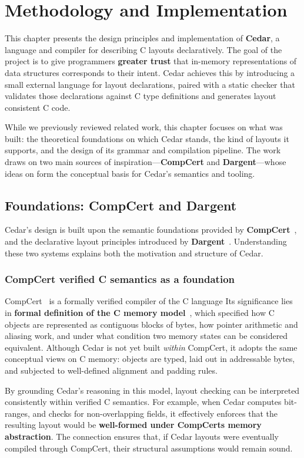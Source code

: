\section{Methodology and Implementation}
This chapter presents the design principles and implementation of
\textbf{Cedar}, a language and compiler for describing
C layouts declaratively.
The goal of the project is to give programmers
\textbf{greater trust} that in-memory representations of data structures
corresponds to their intent.
Cedar achieves this by introducing a small external language
for layout declarations, paired with a static checker that validates 
those declarations against C type definitions and generates
layout consistent C code.

While we previously reviewed related work, this chapter focuses on what
was built: the theoretical foundations on which Cedar stands, the kind
of layouts it supports, and the design of its grammar and compilation
pipeline.
The work draws on two main sources of inspiration—\textbf{CompCert} and
\textbf{Dargent}—whose ideas on form the conceptual basis for
Cedar's semantics and tooling.

\subsection{Foundations: CompCert and Dargent}
Cedar's design is built upon the semantic foundations provided by
\textbf{CompCert}~\cite{leroy2009formal}, and the declarative layout
principles introduced by \textbf{Dargent}~\cite{dargent}.
Understanding these two systems explains both the motivation
and structure of Cedar.

\subsubsection{CompCert verified C semantics as a foundation}
CompCert~\autocite{compcert} is a formally verified compiler of the C language
Its significance lies 
in \textbf{formal definition of the C memory model}~\autocite{leroy2012compcert},
which specified how C objects are represented as contiguous blocks of bytes,
how pointer arithmetic and aliasing work, and under what condition two
memory states can be considered equivalent.
Although Cedar is not yet built \textit{within} CompCert, it adopts
the same conceptual views on C memory: objects are typed, laid out in
addressable bytes, and subjected to well-defined alignment and
padding rules.

By grounding Cedar's reasoning in this model, layout checking can be 
interpreted consistently within verified C semantics.
For example, when Cedar computes bit-ranges, and checks for non-overlapping
fields, it effectively enforces that the resulting layout 
would be \textbf{well-formed under CompCerts memory abstraction}. The
connection ensures that, if Cedar layouts were eventually compiled through
CompCert, their structural assumptions would remain sound.

